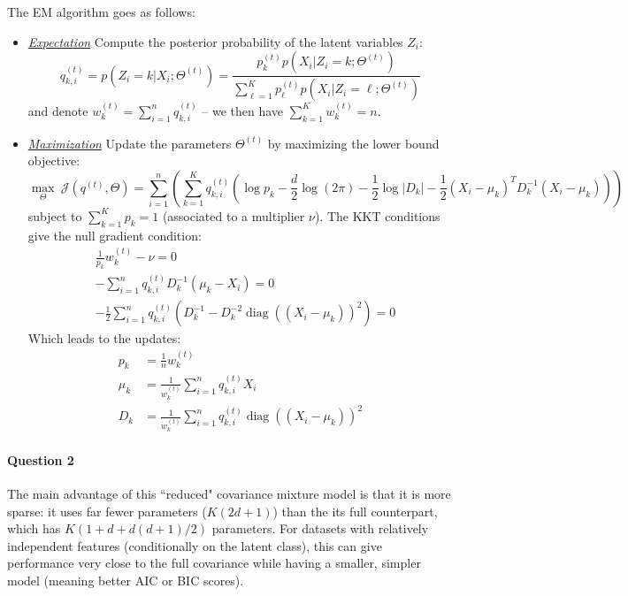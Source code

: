 \documentclass[11pt]{article}
\DeclareMathOperator{\diag}{\mathrm{diag}}
\begin{document}
The EM algorithm goes as follows:
\begin{itemize}
	\item \textit{\underline{Expectation}} Compute the posterior probability of the latent variables $Z_i$:
	\begin{equation}
	q^{(t)}_{k,i} = p(Z_i = k|X_i;\Theta^{(t)}) =
	\frac{
		p^{(t)}_k p(X_i|Z_i=k; \Theta^{(t)})
	}{
		\sum_{\ell=1}^K p^{(t)}_\ell p(X_i|Z_i=\ell; \Theta^{(t)})
	}
	\end{equation}
	and denote $w_k^{(t)} = \sum_{i=1}^n q_{k,i}^{(t)}$ -- we then have $\sum_{k=1}^K w_k^{(t)} = n$.
	\item \textit{\underline{Maximization}} Update the parameters $\Theta^{(t)}$ by maximizing the lower bound objective:
	\[
	\max_{\Theta}~
	\mathcal{J}(q^{(t)}, \Theta) =
	\sum_{i=1}^n \left(
	\sum_{k=1}^K q^{(t)}_{k,i}
	\left(
		\log p_k
		- \frac{d}{2}\log(2\pi)
		- \frac{1}{2}\log{|D_k|}
		- \frac{1}{2}(X_i - \mu_k)^T D_k^{-1}(X_i-\mu_k)
	\right)
	\right)
	\]
	subject to $\sum_{k=1}^K p_k = 1$ (associated to a multiplier $\nu$). The KKT conditions give the null gradient condition:
	\begin{subequations}
	\begin{align}
		& \frac{1}{p_k} w_k^{(t)} - \nu = 0  \\
		& -\sum_{i=1}^n q_{k,i}^{(t)}D_k^{-1}(\mu_k - X_i) = 0  \\
		& -\frac{1}{2}
		\sum_{i=1}^n q_{k,i}^{(t)}
		(D_k^{-1} - D_k^{-2}\diag((X_i-\mu_k))^2) = 0
	\end{align}
	\end{subequations}
	Which leads to the updates:
	\begin{subequations}\label{eq:DiagEMupdate}
	\begin{align}
		p_k &= \frac{1}{n}w_k^{(t)}  \\
		\mu_k &= \frac{1}{w_k^{(t)}}
		\sum_{i=1}^n q_{k,i}^{(t)} X_i  \\
		D_k &= \frac{1}{w_k^{(t)}}
		\sum_{i=1}^n q_{k,i}^{(t)} \diag((X_i-\mu_k))^2
	\end{align}
	\end{subequations}
\end{itemize}

\paragraph{Question 2} The main advantage of this ``reduced" covariance mixture model is that it is more sparse: it uses far fewer parameters ($K(2d+1)$) than the its full counterpart, which has $K(1 + d + d(d+1)/2)$ parameters. For datasets with relatively independent features (conditionally on the latent class), this can give performance very close to the full covariance while having a smaller, simpler model (meaning better AIC or BIC scores).
\end{document}
